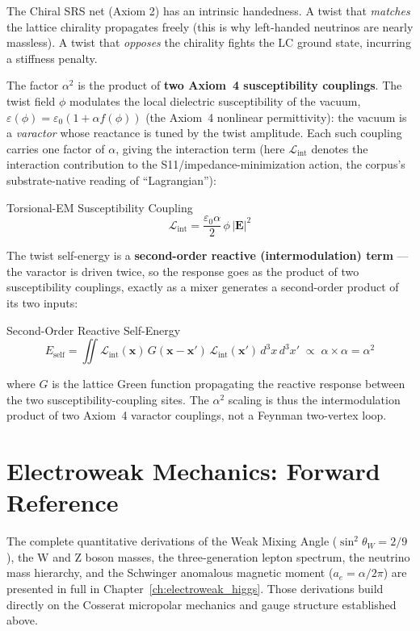 The Chiral SRS net (Axiom 2) has an intrinsic handedness. A twist that \emph{matches} the lattice chirality propagates freely (this is why left-handed neutrinos are nearly massless). A twist that \emph{opposes} the chirality fights the LC ground state, incurring a stiffness penalty.

The factor $\alpha^2$ is the product of \textbf{two Axiom~4 susceptibility couplings}. The twist field $\phi$ modulates the local dielectric susceptibility of the vacuum, $\varepsilon(\phi) = \varepsilon_0(1 + \alpha f(\phi))$ (the Axiom~4 nonlinear permittivity): the vacuum is a \emph{varactor} whose reactance is tuned by the twist amplitude. Each such coupling carries one factor of $\alpha$, giving the interaction term (here $\mathcal{L}_{\text{int}}$ denotes the interaction contribution to the S11/impedance-minimization action, the corpus's substrate-native reading of ``Lagrangian''):
\begin{resultbox}{Torsional-EM Susceptibility Coupling}
\begin{equation}
    \mathcal{L}_{\text{int}} = \frac{\varepsilon_0 \alpha}{2}\,\phi\,|\mathbf{E}|^2
\end{equation}
\end{resultbox}
The twist self-energy is a \textbf{second-order reactive (intermodulation) term} --- the varactor is driven twice, so the response goes as the product of two susceptibility couplings, exactly as a mixer generates a second-order product of its two inputs:
\begin{resultbox}{Second-Order Reactive Self-Energy}
\begin{equation}
    E_{\text{self}} = \iint \mathcal{L}_{\text{int}}(\mathbf{x})\, G(\mathbf{x}-\mathbf{x}')\, \mathcal{L}_{\text{int}}(\mathbf{x}')\, d^3x\, d^3x' \;\propto\; \alpha \times \alpha = \alpha^2
\end{equation}
\end{resultbox}
where $G$ is the lattice Green function propagating the reactive response between the two susceptibility-coupling sites. The $\alpha^2$ scaling is thus the intermodulation product of two Axiom~4 varactor couplings, not a Feynman two-vertex loop.

\section{Electroweak Mechanics: Forward Reference}

The complete quantitative derivations of the Weak Mixing Angle ($\sin^2\theta_W = 2/9$), the W and Z boson masses, the three-generation lepton spectrum, the neutrino mass hierarchy, and the Schwinger anomalous magnetic moment ($a_e = \alpha/2\pi$) are presented in full in Chapter~\ref{ch:electroweak_higgs}. Those derivations build directly on the Cosserat micropolar mechanics and gauge structure established above.


